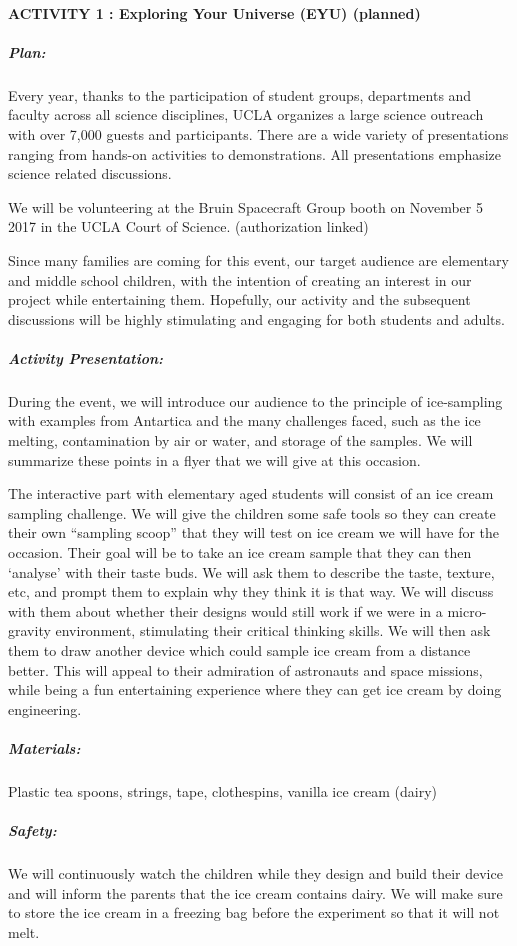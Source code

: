 \documentclass{article}
\begin{document}
\paragraph{ACTIVITY 1 : Exploring Your Universe (EYU) (planned)}
\subparagraph{Plan:}
Every year, thanks to the participation of student groups, departments and faculty across all science disciplines, UCLA organizes a large science outreach with over 7,000 guests and participants. There are a wide variety of presentations ranging from hands-on activities to demonstrations. All presentations emphasize science related discussions.\par
We will be volunteering at the Bruin Spacecraft Group booth on November 5 2017 in the UCLA Court of Science. (authorization linked) \par
Since many families are coming for this event, our target audience are elementary and middle school children, with the intention of creating an interest in our project while entertaining them. Hopefully, our activity and the subsequent discussions will be highly stimulating and engaging for both students and adults.\par
\subparagraph{Activity Presentation:}
During the event, we will introduce our audience to the principle of ice-sampling with examples from Antartica and the many challenges faced, such as the ice melting, contamination by air or water, and storage of the samples. We will summarize these points in a flyer that we will give at this occasion.\par
The interactive part with elementary aged students will consist of an ice cream sampling challenge. We will give the children some safe tools so they can create their own “sampling scoop” that they will test on ice cream we will have for the occasion. Their goal will be to take an ice cream sample that they can then ‘analyse’ with their taste buds. We will ask them to describe the taste, texture, etc, and prompt them to explain why they think it is that way. We will discuss with them about whether their designs would still work if we were in a micro-gravity environment, stimulating their critical thinking skills. We will then ask them to draw another device which could sample ice cream from a distance better. This will appeal to their admiration of astronauts and space missions, while being a fun entertaining experience where they can get ice cream by doing engineering.\par
\subparagraph{Materials:}
Plastic tea spoons, strings, tape, clothespins, vanilla ice cream (dairy)
\subparagraph{Safety:}
We will continuously watch the children while they design and build their device and will inform the parents that the ice cream contains dairy. We will make sure to store the ice cream in a freezing bag before the experiment so that it will not melt.
\end{document}
